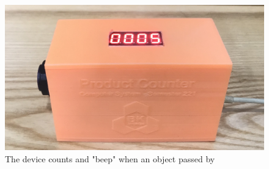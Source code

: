 \documentclass[13pt,a4paper,twoside]{report}
\begin{document}
\begin{figure}[H]
\includegraphics[scale=0.08]{images/counter_5.jpg}
\caption{The device counts and "beep" when an object passed by}
\end{figure}
\end{document}
